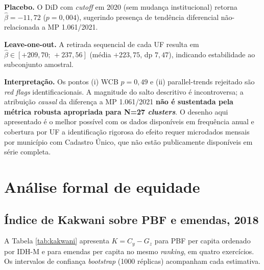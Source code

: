 \documentclass[12pt,a4paper,oneside]{article}
\begin{document}
\textbf{Placebo.} O DiD com \textit{cutoff} em 2020 (sem mudança
institucional) retorna $\hat\beta = -11,72$ ($p = 0,004$),
sugerindo presença de tendência diferencial não-relacionada a MP
1.061/2021.

\textbf{Leave-one-out.} A retirada sequencial de cada UF resulta
em $\hat\beta \in [+209,70;\,+237,56]$ (média $+223,75$, dp $7,47$),
indicando estabilidade ao subconjunto amostral.

\textbf{Interpretação.} Os pontos (i) WCB $p = 0,49$ e (ii)
parallel-trends rejeitado são \textit{red flags} identificacionais.
A magnitude do salto descritivo é incontroversa; a atribuição
\textit{causal} da diferença a MP 1.061/2021 \textbf{não é sustentada
pela métrica robusta apropriada para N=27 \textit{clusters}}. O
desenho aqui apresentado é o melhor possível com os dados
disponíveis em frequência anual e cobertura por UF \textemdash{} a
identificação rigorosa do efeito requer microdados mensais por
município com Cadastro Único, que não estão publicamente disponíveis
em série completa.

\section{Análise formal de equidade}\label{sec:equidade}

\subsection{Índice de Kakwani sobre PBF e emendas, 2018}

A Tabela \ref{tab:kakwani} apresenta $K = C_y - G_z$ para PBF
per capita ordenado por IDH-M e para emendas per capita no mesmo
\textit{ranking}, em quatro exercícios. Os intervalos de confiança
\textit{bootstrap} (1000 réplicas) acompanham cada estimativa.
\end{document}
